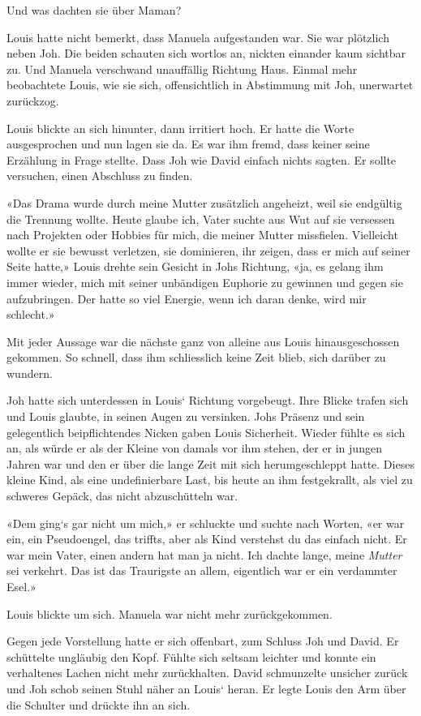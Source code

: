 Und was dachten sie über Maman?

Louis hatte nicht bemerkt, dass Manuela aufgestanden war. Sie war
plötzlich neben Joh. Die beiden schauten sich wortlos an, nickten
einander kaum sichtbar zu. Und Manuela verschwand unauffällig Richtung
Haus. Einmal mehr beobachtete Louis, wie sie sich, offensichtlich in
Abstimmung mit Joh, unerwartet zurückzog.

Louis blickte an sich hinunter, dann irritiert hoch. Er hatte die Worte
ausgesprochen und nun lagen sie da. Es war ihm fremd, dass keiner seine
Erzählung in Frage stellte. Dass Joh wie David einfach nichts sagten. Er
sollte versuchen, einen Abschluss zu finden.

«Das Drama wurde durch meine Mutter zusätzlich angeheizt, weil sie
endgültig die Trennung wollte. Heute glaube ich, Vater suchte aus Wut
auf sie versessen nach Projekten oder Hobbies für mich, die meiner
Mutter missfielen. Vielleicht wollte er sie bewusst verletzen, sie
dominieren, ihr zeigen, dass er mich auf seiner Seite hatte,» Louis
drehte sein Gesicht in Johs Richtung, «ja, es gelang ihm immer wieder,
mich mit seiner unbändigen Euphorie zu gewinnen und gegen sie
aufzubringen. Der hatte so viel Energie, wenn ich daran denke, wird mir
schlecht.»

Mit jeder Aussage war die nächste ganz von alleine aus Louis
hinausgeschossen gekommen. So schnell, dass ihm schliesslich keine Zeit
blieb, sich darüber zu wundern.

Joh hatte sich unterdessen in Louis` Richtung vorgebeugt. Ihre Blicke
trafen sich und Louis glaubte, in seinen Augen zu versinken. Johs
Präsenz und sein gelegentlich beipflichtendes Nicken gaben Louis
Sicherheit. Wieder fühlte es sich an, als würde er als der Kleine von
damals vor ihm stehen, der er in jungen Jahren war und den er über die
lange Zeit mit sich herumgeschleppt hatte. Dieses kleine Kind, als eine
undefinierbare Last, bis heute an ihm festgekrallt, als viel zu schweres
Gepäck, das nicht abzuschütteln war.

«Dem ging`s gar nicht um mich,» er schluckte und suchte nach Worten, «er
war ein, ein Pseudoengel, das triffts, aber als Kind verstehst du das
einfach nicht. Er war mein Vater, einen andern hat man ja nicht. Ich
dachte lange, meine \emph{Mutter} sei verkehrt. Das ist das Traurigste
an allem, eigentlich war er ein verdammter Esel.»

Louis blickte um sich. Manuela war nicht mehr zurückgekommen.

Gegen jede Vorstellung hatte er sich offenbart, zum Schluss Joh und
David. Er schüttelte ungläubig den Kopf. Fühlte sich seltsam leichter
und konnte ein verhaltenes Lachen nicht mehr zurückhalten. David
schmunzelte unsicher zurück und Joh schob seinen Stuhl näher an Louis`
heran. Er legte Louis den Arm über die Schulter und drückte ihn an sich.

